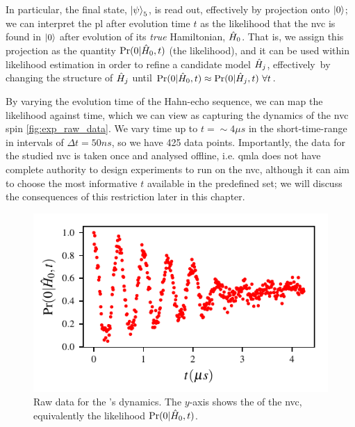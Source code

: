 In particular, the final state, $\ket{\psi}_5$, is read out, effectively by projection onto $\ket{0}$;
    we can interpret the \gls{pl} after evolution time $t$ as the \gls{likelihood} 
    that the \gls{nvc} is found in $\ket{0}$ after evolution of its \emph{true} Hamiltonian, $\hat{H}_0$. 
That is, we assign this projection as the quantity $\Pr(0 | \hat{H}_0, t)$ (the \gls{likelihood}), 
    and it can be used within likelihood estimation in order to refine a candidate model $\hat{H}_j$, 
    effectively\footnotemark \ by changing the structure of 
    $\hat{H}_j$ until $\Pr(0 | \hat{H}_0, t) \approx \Pr(0 | \hat{H}_j, t) \ \forall t$. 

\par 

By varying the evolution time of the Hahn-echo sequence, we can map the likelihood 
    against time, which we can view as capturing the dynamics of the \gls{nvc} spin \cref{fig:exp_raw_data}.
We vary time up to $t = \sim 4 \mu s$ in the short-time-range in intervals of $\Delta t = 50 ns$, 
    so we have 425 data points. 
Importantly, the data for the studied \gls{nvc} is taken once and analysed offline, 
    i.e. \gls{qmla} does not have complete authority to design experiments 
    to run on the \gls{nvc}, although it can aim to choose the most informative $t$ 
    available in the predefined set; we will discuss the consequences of this restriction 
    later in this chapter. 

\begin{figure}
    \begin{center}
        \includegraphics{experimental_study/figures/raw_data.pdf}
    \end{center}
    \caption[Raw data for the 's dynamics.]{
        Raw data for the 's dynamics.
        The $y$-axis shows the  of the \gls{nvc}, 
        equivalently the likelihood $\Pr(0 | \hat{H}_0, t)$. 
    }
\end{figure}


